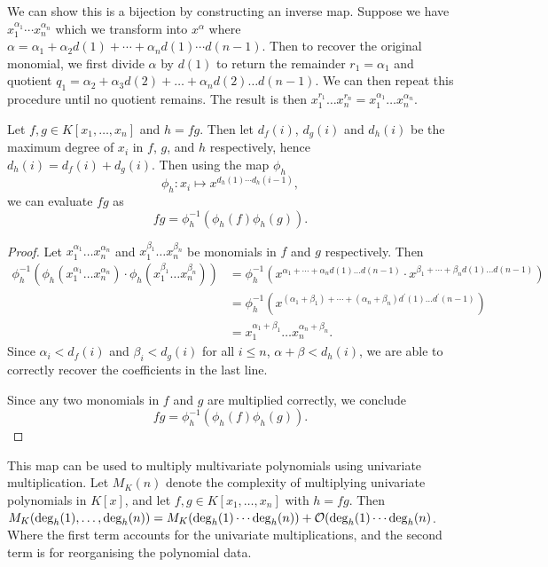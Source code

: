 We can show this is a bijection by constructing an inverse map. Suppose we have $x_1^{\alpha_1}\cdots x_n^{\alpha_n}$ which we transform into $x^\alpha$ where $\alpha = \alpha_1 + \alpha_2 d(1) +  \cdots + \alpha_n d(1) \cdots d(n-1)$. Then to recover the original monomial, we first divide $\alpha$ by $d(1)$ to return the remainder $r_1 = \alpha_1$ and quotient $q_1 = \alpha_2 + \alpha_3 d(2) + \ldots + \alpha_n d(2) \ldots d(n-1)$. We can then repeat this procedure until no quotient remains. The result is then $x_1^{r_1} \ldots x_n^{r_n} = x_1^{\alpha_1} \ldots x_n^{\alpha_n}$.

\begin{proposition}
    Let $f, g \in K[x_1, \ldots, x_n]$ and $h = fg$. Then let $d_f(i)$, $d_g(i)$ and $d_h(i)$ be the maximum degree of $x_i$ in $f$, $g$, and $h$ respectively, hence $d_h(i) = d_f(i) + d_g(i)$. Then using the map $\phi_h$
    \[
        \phi_h: x_i \mapsto x^{d_h(1) \cdots d_h(i-1)},
    \]
    we can evaluate $fg$ as
    \[
        f g= \phi^{-1}_h(\phi_h(f) \phi_h(g)).
    \]
\end{proposition}

\begin{proof}
    Let $x_1^{\alpha_1}\ldots x_n^{\alpha_n}$ and $x_1^{\beta_1}\ldots x_n^{\beta_n}$ be monomials in $f$ and $g$ respectively. Then
    \begin{align*}
        \phi_h^{-1}(\phi_h(x_1^{\alpha_1}\ldots x_n^{\alpha_n}) \cdot \phi_h(x_1^{\beta_1}\ldots x_n^{\beta_n}))
        &= \phi_h^{-1}(x^{\alpha_1 + \cdots  + \alpha_n d(1) \ldots d(n-1)} \cdot x^{\beta_1 + \cdots + \beta_n d(1) \ldots d(n-1)})\\
        &= \phi_h^{-1}(x^{(\alpha_1 + \beta_1) + \cdots + (\alpha_n + \beta_n)d^\prime(1) \ldots d^\prime(n-1)})\\
        &= x_1^{\alpha_1 + \beta_1} \ldots x_n^{\alpha_n + \beta_n}.
    \end{align*}
    Since $\alpha_i < d_f(i)$ and $\beta_i < d_g(i)$ for all $i \le n$, $\alpha + \beta < d_h(i)$, we are able to correctly recover the coefficients in the last line.

    Since any two monomials in $f$ and $g$ are multiplied correctly, we conclude
    \[
        f g= \phi^{-1}_h(\phi_h(f) \phi_h(g)).
    \]
\end{proof}

This map can be used to multiply multivariate polynomials using univariate multiplication. Let $M_K(n)$ denote the complexity of multiplying univariate polynomials in $K[x]$, and let $f, g \in K[x_1, \ldots, x_n]$ with $h = fg$. Then $M_K(\deg_h(1), \ldots, \deg_h(n)) = M_K(\deg_h(1) \cdots \deg_h (n)) + \mathcal O(\deg_h(1) \cdots \deg_h(n)$. Where the first term accounts for the univariate multiplications, and the second term is for reorganising the polynomial data.



